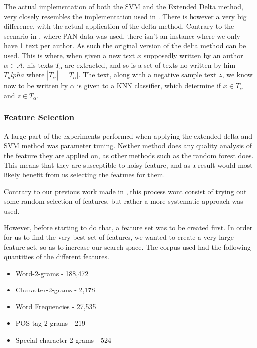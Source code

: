 The actual implementation of both the \gls{SVM} and the Extended Delta method,
very closely resembles the implementation used in \cite{US}. There is however
a very big difference, with the actual application of the delta method.
Contrary to the scenario in \cite{US}, where PAN data was used, there isn't an
instance where we only have 1 text per author. As such the original version
of the delta method can be used. This is where, when given a new text $x$
supposedly written by an author $\alpha \in \mathcal{A}$, his texts $T_\alpha$
are extracted, and so is a set of texts no written by him $\overline{T}_alpha$
where $|\overline{T}_\alpha| = |T_\alpha|$. The text, along with a negative
sample text $z$, we know now to be written by $\alpha$ is given to a \gls{KNN}
classifier, which determine if $x \in T_\alpha$ and $z \in \overline{T}_\alpha$.

\subsubsection{Feature Selection}

A large part of the experiments performed when applying the extended delta and
\gls{SVM} method was parameter tuning. Neither method does any quality analysis
of the feature they are applied on, as other methods such as the random forest
does. This means that they are susceptible to noisy feature, and as a result
would most likely benefit from us selecting the features for them.

Contrary to our previous work made in \cite{US}, this process wont
consist of trying out some random selection of features, but rather
a more systematic approach was used. 

However, before starting to do that, a feature set was to be created
first. In order for us to find the very best set of features, we wanted
to create a very large feature set, so as to increase our search space.
The corpus used had the following quantities of the different features.

\begin{itemize}
    \item Word-2-grams - 188,472
    \item Character-2-grams - 2,178
    \item Word Frequencies - 27,535
    \item \gls{POS}-tag-2-grams - 219
    \item Special-character-2-grams - 524
\end{itemize}

